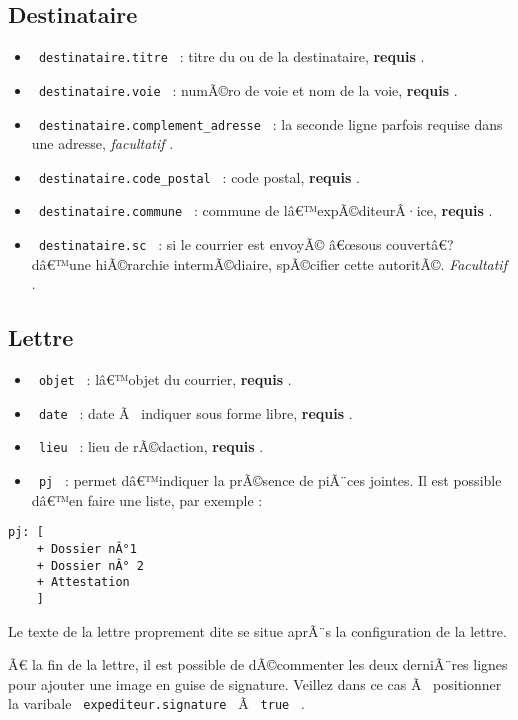 \subsection{Destinataire}\label{destinataire}

\begin{itemize}
\tightlist
\item
  \texttt{\ destinataire.titre\ } : titre du ou de la destinataire,
  \textbf{requis} .
\item
  \texttt{\ destinataire.voie\ } : numÃ©ro de voie et nom de la voie,
  \textbf{requis} .
\item
  \texttt{\ destinataire.complement\_adresse\ } : la seconde ligne
  parfois requise dans une adresse, \emph{facultatif} .
\item
  \texttt{\ destinataire.code\_postal\ } : code postal, \textbf{requis}
  .
\item
  \texttt{\ destinataire.commune\ } : commune de lâ€™expÃ©diteurÂ·ice,
  \textbf{requis} .
\item
  \texttt{\ destinataire.sc\ } : si le courrier est envoyÃ© â€œsous
  couvertâ€? dâ€™une hiÃ©rarchie intermÃ©diaire, spÃ©cifier cette
  autoritÃ©. \emph{Facultatif} .
\end{itemize}

\subsection{Lettre}\label{lettre}

\begin{itemize}
\tightlist
\item
  \texttt{\ objet\ } : lâ€™objet du courrier, \textbf{requis} .
\item
  \texttt{\ date\ } : date Ã~ indiquer sous forme libre, \textbf{requis}
  .
\item
  \texttt{\ lieu\ } : lieu de rÃ©daction, \textbf{requis} .
\item
  \texttt{\ pj\ } : permet dâ€™indiquer la prÃ©sence de piÃ¨ces jointes.
  Il est possible dâ€™en faire une liste, par exemple :
\end{itemize}

\begin{verbatim}
pj: [
    + Dossier nÂ°1
    + Dossier nÂ° 2
    + Attestation
    ]
\end{verbatim}

Le texte de la lettre proprement dite se situe aprÃ¨s la configuration
de la lettre.

Ã€ la fin de la lettre, il est possible de dÃ©commenter les deux
derniÃ¨res lignes pour ajouter une image en guise de signature. Veillez
dans ce cas Ã~ positionner la varibale \texttt{\ expediteur.signature\ }
Ã \texttt{\ true\ } .

